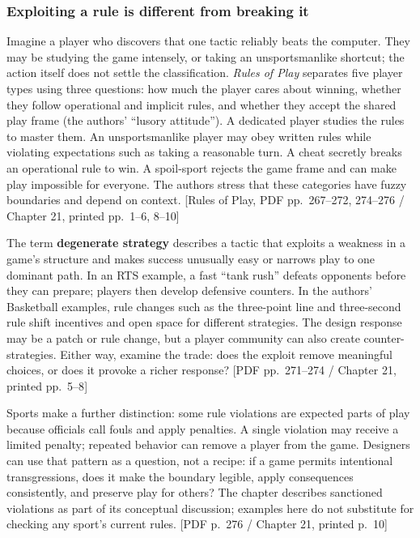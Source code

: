 \subsubsection{Exploiting a rule is different from breaking it}\label{05-engine-i-ch009-exploiting-a-rule-is-different-from-breaking-it}

Imagine a player who discovers that one tactic reliably beats the computer. They may be studying the game intensely, or taking an unsportsmanlike shortcut; the action itself does not settle the classification. \emph{Rules of Play} separates five player types using three questions: how much the player cares about winning, whether they follow operational and implicit rules, and whether they accept the shared play frame (the authors' ``lusory attitude''). A dedicated player studies the rules to master them. An unsportsmanlike player may obey written rules while violating expectations such as taking a reasonable turn. A cheat secretly breaks an operational rule to win. A spoil-sport rejects the game frame and can make play impossible for everyone. The authors stress that these categories have fuzzy boundaries and depend on context. {[}Rules of Play, PDF pp.~267--272, 274--276 / Chapter 21, printed pp.~1--6, 8--10{]}

The term \textbf{degenerate strategy} describes a tactic that exploits a weakness in a game's structure and makes success unusually easy or narrows play to one dominant path. In an RTS example, a fast ``tank rush'' defeats opponents before they can prepare; players then develop defensive counters. In the authors' Basketball examples, rule changes such as the three-point line and three-second rule shift incentives and open space for different strategies. The design response may be a patch or rule change, but a player community can also create counter-strategies. Either way, examine the trade: does the exploit remove meaningful choices, or does it provoke a richer response? {[}PDF pp.~271--274 / Chapter 21, printed pp.~5--8{]}

Sports make a further distinction: some rule violations are expected parts of play because officials call fouls and apply penalties. A single violation may receive a limited penalty; repeated behavior can remove a player from the game. Designers can use that pattern as a question, not a recipe: if a game permits intentional transgressions, does it make the boundary legible, apply consequences consistently, and preserve play for others? The chapter describes sanctioned violations as part of its conceptual discussion; examples here do not substitute for checking any sport's current rules. {[}PDF p.~276 / Chapter 21, printed p.~10{]}

